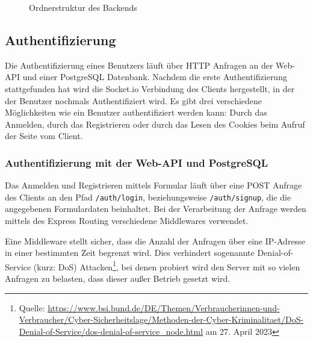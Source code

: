 \begin{figure}[h]
\centering

\begin{minipage}{0.5\textwidth}
\end{minipage}
\caption{Ordnerstruktur des Backends}
\label{fig:backend_dirtree}

\end{figure}


\subsection{Authentifizierung}
Die Authentifizierung eines Benutzers läuft über HTTP Anfragen an der Web-API und einer PostgreSQL Datenbank.
Nachdem die erste Authentifizierung stattgefunden hat wird die Socket.io Verbindung des Clients hergestellt, in der der Benutzer nochmals Authentifiziert wird.
Es gibt drei verschiedene Möglichkeiten wie ein Benutzer authentifiziert werden kann: Durch das Anmelden, durch das Registrieren oder durch das Lesen des Cookies beim Aufruf der Seite vom Client.

\subsubsection{Authentifizierung mit der Web-API und PostgreSQL}
Das Anmelden und Registrieren mittels Formular läuft über eine POST Anfrage des Clients an den Pfad \verb|/auth/login|, beziehungsweise \verb|/auth/signup|, die die angegebenen Formulardaten beinhaltet. Bei der Verarbeitung der Anfrage werden mittels des Express Routing verschiedene Middlewares verwendet.

Eine Middleware stellt sicher, dass die Anzahl der Anfragen über eine IP-Adresse in einer bestimmten Zeit begrenzt wird. Dies verhindert sogenannte Denial-of-Service (kurz: DoS) Attacken\footnote{Quelle: \url{https://www.bsi.bund.de/DE/Themen/Verbraucherinnen-und-Verbraucher/Cyber-Sicherheitslage/Methoden-der-Cyber-Kriminalitaet/DoS-Denial-of-Service/dos-denial-of-service_node.html} am 27. April 2023}, bei denen probiert wird den Server mit so vielen Anfragen zu belasten, dass dieser außer Betrieb gesetzt wird.

